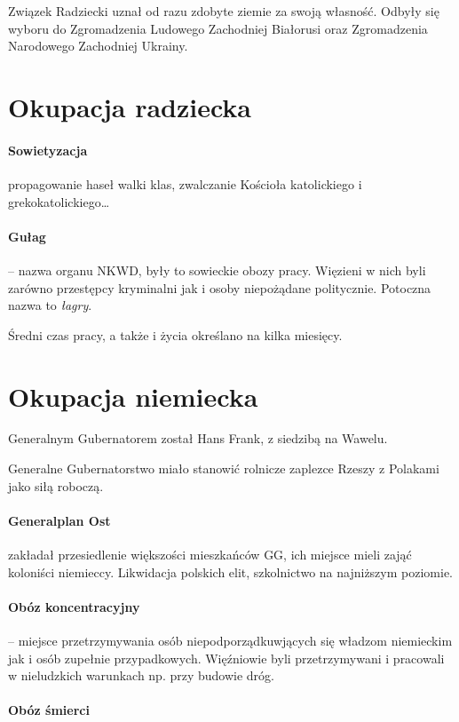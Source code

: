 \documentclass [a4paper, 11pt, oneside]{book}
\begin{document}
Związek Radziecki uznał od razu zdobyte ziemie za swoją własność. Odbyły się wyboru do Zgromadzenia Ludowego Zachodniej Białorusi oraz Zgromadzenia Narodowego Zachodniej Ukrainy.

\section{Okupacja radziecka}

\paragraph{Sowietyzacja} propagowanie haseł walki klas, zwalczanie Kościoła katolickiego i grekokatolickiego\dots

\paragraph{Gułag} -- nazwa organu NKWD, były to sowieckie obozy pracy. Więzieni w nich byli zarówno przestępcy kryminalni jak i osoby niepożądane politycznie. Potoczna nazwa to \emph{łagry}.

Średni czas pracy, a także i życia określano na kilka miesięcy.

\section{Okupacja niemiecka}

Generalnym Gubernatorem został Hans Frank, z siedzibą na Wawelu.

Generalne Gubernatorstwo miało stanowić rolnicze zaplezce Rzeszy z Polakami jako siłą roboczą.

\paragraph{Generalplan Ost} zakładał przesiedlenie większości mieszkańców GG, ich miejsce mieli zająć koloniści niemieccy. Likwidacja polskich elit, szkolnictwo na najniższym poziomie.

\paragraph{Obóz koncentracyjny} -- miejsce przetrzymywania osób niepodporządkuwjących się władzom niemieckim jak i osób zupełnie przypadkowych. Więźniowie byli przetrzymywani i pracowali w nieludzkich warunkach np. przy budowie dróg.

\paragraph{Obóz śmierci}
\end{document}
